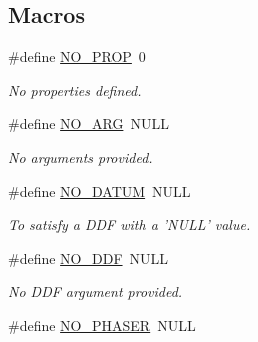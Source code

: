 \subsection*{Macros}
\begin{DoxyCompactItemize}
\item 
\hypertarget{group__HClib_ga30194cc5d8d8041b2585a6ccded665e8}{\#define \hyperlink{group__HClib_ga30194cc5d8d8041b2585a6ccded665e8}{N\-O\-\_\-\-P\-R\-O\-P}~0}\label{group__HClib_ga30194cc5d8d8041b2585a6ccded665e8}

\begin{DoxyCompactList}\small\item\em No properties defined. \end{DoxyCompactList}\item 
\hypertarget{group__HClib_ga2d0022791143e08a64621257f48d9739}{\#define \hyperlink{group__HClib_ga2d0022791143e08a64621257f48d9739}{N\-O\-\_\-\-A\-R\-G}~N\-U\-L\-L}\label{group__HClib_ga2d0022791143e08a64621257f48d9739}

\begin{DoxyCompactList}\small\item\em No arguments provided. \end{DoxyCompactList}\item 
\hypertarget{group__HClib_gad96d6ab6270f0f2c1757c24e1c99dd77}{\#define \hyperlink{group__HClib_gad96d6ab6270f0f2c1757c24e1c99dd77}{N\-O\-\_\-\-D\-A\-T\-U\-M}~N\-U\-L\-L}\label{group__HClib_gad96d6ab6270f0f2c1757c24e1c99dd77}

\begin{DoxyCompactList}\small\item\em To satisfy a D\-D\-F with a 'N\-U\-L\-L' value. \end{DoxyCompactList}\item 
\hypertarget{group__HClib_ga9753a1ed016c4e4d40ef7a4215ad9486}{\#define \hyperlink{group__HClib_ga9753a1ed016c4e4d40ef7a4215ad9486}{N\-O\-\_\-\-D\-D\-F}~N\-U\-L\-L}\label{group__HClib_ga9753a1ed016c4e4d40ef7a4215ad9486}

\begin{DoxyCompactList}\small\item\em No D\-D\-F argument provided. \end{DoxyCompactList}\item 
\hypertarget{group__HClib_ga74e2e6a863d9d6e1990b69cbcf633212}{\#define \hyperlink{group__HClib_ga74e2e6a863d9d6e1990b69cbcf633212}{N\-O\-\_\-\-P\-H\-A\-S\-E\-R}~N\-U\-L\-L}\label{group__HClib_ga74e2e6a863d9d6e1990b69cbcf633212}


\end{DoxyCompactItemize}
